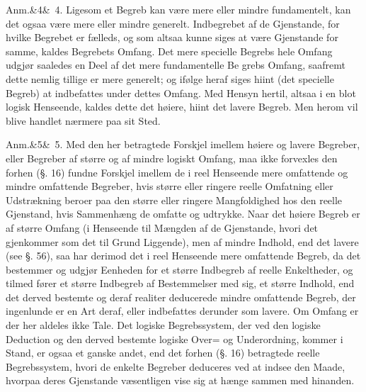 \documentclass[12pt]{book}
\def\sperr#1{#1}%
\def\textit#1{#1}%
\def\emph#1{#1}%
\newcommand{\sperr}[1]{\textls[180]{#1}}
\newcommand{\anm}[1]{%
  \par\vspace{0.5\baselineskip}%
  \noindent\hspace{\parindent}\sperr{Anm.}\ifx&#1&\else~\textit{#1}.\fi
  \enspace\ignorespaces
}
\newcommand{\opage}[1]{\marginnote{\footnotesize\textit{[#1]}}}
\begin{document}
\anm{4} Ligesom et Begreb kan være \emph{mere eller mindre fundamentelt}, kan det
ogsaa være \emph{mere eller mindre generelt}. Indbegrebet af de Gjenstande, for
hvilke Begrebet er fælleds, og som altsaa kunne siges at være Gjenstande for samme,
kaldes \emph{Begrebets Omfang}. Det mere specielle Begrebs hele Omfang udgjør
saaledes en Deel af det mere fundamentelle Be%
\opage{147}grebs Omfang, saafremt dette nemlig tillige er mere generelt; og ifølge heraf siges
hiint (det specielle Begreb) at indbefattes under dettes Omfang. Med Hensyn hertil,
altsaa i en \emph{blot logisk Henseende}, kaldes dette \emph{det høiere}, hiint
\emph{det lavere} Begreb. Men herom vil blive handlet nærmere paa sit Sted.

\anm{5} Med den her betragtede Forskjel imellem \emph{høiere og lavere} Begreber,
eller Begreber af \emph{større og af mindre logiskt Omfang}, maa ikke forvexles den
forhen (§. 16) fundne Forskjel imellem de i reel Henseende \emph{mere omfattende og
mindre omfattende} Begreber, hvis større eller ringere reelle Omfatning eller
Udstrækning beroer paa den større eller ringere Mangfoldighed hos den reelle
Gjenstand, hvis Sammenhæng de omfatte og udtrykke. Naar det høiere Begreb er af
større Omfang (i Henseende til Mængden af de Gjenstande, hvori det gjenkommer som det
til Grund Liggende), men af mindre Indhold, end det lavere (see §. 56), saa har
derimod det i reel Henseende mere omfattende Begreb, da det bestemmer og udgjør
Eenheden for et større Indbegreb af reelle Enkeltheder, og tilmed fører et større
Indbegreb af Bestemmelser med sig, et større Indhold, end det derved bestemte og
deraf \textit{realiter} deducerede mindre omfattende Begreb, der ingenlunde er en Art
deraf, eller indbefattes derunder som lavere. Om Omfang er der her aldeles ikke Tale.
Det logiske Begrebssystem, der ved den logiske Deduction og den derved
\opage{148} bestemte logiske Over= og Underordning, kommer i Stand, er ogsaa et ganske andet, end
det forhen (§. 16) betragtede reelle Begrebssystem, hvori de enkelte Begreber
deduceres ved at indsee den Maade, hvorpaa deres Gjenstande væsentligen vise sig at
hænge sammen med hinanden.
\end{document}
